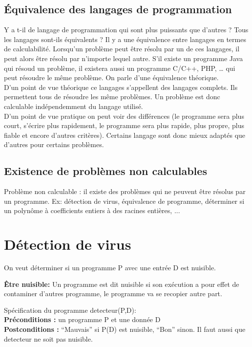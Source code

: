 \subsection{ Équivalence des langages de programmation}
Y a t-il de langage de programmation qui sont plus puissants que d'autres ? Tous les langages sont-ils équivalents ? 
\newline 
Il y a une équivalence entre langages en termes de calculabilité.  Lorsqu'un problème peut être résolu par un de ces langages, il peut alors être résolu par n'importe lequel autre.   
S'il existe un programme Java qui résoud un problème, il existera aussi un programme C/C++, PHP, … qui peut résoudre le même problème. On parle d'une équivalence théorique.\\
D'un point de vue théorique ce langages s'appellent des langages complets. Ils permettent tous de résoudre les même problèmes.  Un problème est donc calculable indépendemment du langage utilisé. \\
D'un point de vue pratique on peut voir des différences (le programme sera plus court, s'écrire plus rapidement, le programme sera plus rapide, plus propre, plus fiable et encore d'autres critères).  Certains langage sont donc mieux adaptés que d'autres pour certains problèmes. 


	\subsection{Existence de problèmes non calculables}
	Problème non calculable : il existe des problèmes qui ne peuvent
		être résolus par un programme. Ex:
        détection de virus,
        équivalence de programme,
        déterminer si un polynôme à coefficients entiers à des racines entières, ...
	



\section{Détection de virus}
\label{sec:d_tection_de_virus}
On veut déterminer si un programme P avec une entrée D est nuisible.

\textbf{Être nuisible:} Un programme est dit nuisible si son exécution a pour effet de contaminer d'autres programme, le programme va se recopier autre part. 

Spécification du programme detecteur(P,D):\\
\textbf{Préconditions :} un programme P et une donnée D\\
\textbf{Postconditions :} ``Mauvais'' si P(D) est nuisible,
		``Bon'' sinon.
Il faut aussi que detecteur ne soit pas nuisible.

